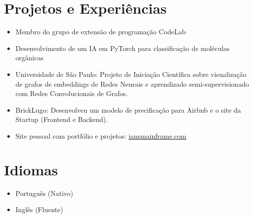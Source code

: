 \documentclass[a4paper,12pt]{article}
\begin{document}
\section*{Projetos e Experiências}
\vspace{-0.5em}
\begin{itemize}[leftmargin=*, itemsep=-1.5pt]
  \item Membro do grupo de extensão de programação CodeLab
  \item Desenvolvimento de um IA em PyTorch para classificação de moléculas orgânicas
  \item Universidade de São Paulo: Projeto de Iniciação Científica sobre visualização de grafos de embeddings de Redes Neurais e aprendizado semi-supervisionado com Redes Convolucionais de Grafos.
  \item BrickLugo: Desenvolveu um modelo de precificação para Airbnb e o site da Startup (Frontend e Backend).
  \item Site pessoal com portfólio e projetos: \href{https://iansmainframe.com}{iansmainframe.com}
\end{itemize}
\vspace{-0.5em}

\section*{Idiomas}
\vspace{-0.5em}
\begin{itemize}[leftmargin=*, itemsep=-1.5pt]
  \item Português (Nativo)
  \item Inglês (Fluente)
\end{itemize}
\end{document}
